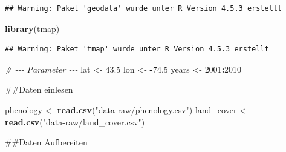 \documentclass[
]{article}
\newenvironment{Shaded}{\begin{snugshade}}{\end{snugshade}}
\newcommand{\CommentTok}[1]{\textcolor[rgb]{0.56,0.35,0.01}{\textit{#1}}}
\newcommand{\DecValTok}[1]{\textcolor[rgb]{0.00,0.00,0.81}{#1}}
\newcommand{\FloatTok}[1]{\textcolor[rgb]{0.00,0.00,0.81}{#1}}
\newcommand{\FunctionTok}[1]{\textcolor[rgb]{0.13,0.29,0.53}{\textbf{#1}}}
\newcommand{\NormalTok}[1]{#1}
\newcommand{\OtherTok}[1]{\textcolor[rgb]{0.56,0.35,0.01}{#1}}
\newcommand{\SpecialCharTok}[1]{\textcolor[rgb]{0.81,0.36,0.00}{\textbf{#1}}}
\newcommand{\StringTok}[1]{\textcolor[rgb]{0.31,0.60,0.02}{#1}}
\begin{document}
\begin{verbatim}
## Warning: Paket 'geodata' wurde unter R Version 4.5.3 erstellt
\end{verbatim}

\begin{Shaded}
\begin{Highlighting}[]
\FunctionTok{library}\NormalTok{(tmap)}
\end{Highlighting}
\end{Shaded}

\begin{verbatim}
## Warning: Paket 'tmap' wurde unter R Version 4.5.3 erstellt
\end{verbatim}

\begin{Shaded}
\begin{Highlighting}[]
\CommentTok{\# {-}{-}{-} Parameter {-}{-}{-}}
\NormalTok{lat }\OtherTok{\textless{}{-}} \FloatTok{43.5}
\NormalTok{lon }\OtherTok{\textless{}{-}} \SpecialCharTok{{-}}\FloatTok{74.5}
\NormalTok{years }\OtherTok{\textless{}{-}} \DecValTok{2001}\SpecialCharTok{:}\DecValTok{2010}
\end{Highlighting}
\end{Shaded}

\#\#Daten einlesen

\begin{Shaded}
\begin{Highlighting}[]
\NormalTok{phenology }\OtherTok{\textless{}{-}} \FunctionTok{read.csv}\NormalTok{(}\StringTok{"data{-}raw/phenology.csv"}\NormalTok{)}
\NormalTok{land\_cover }\OtherTok{\textless{}{-}} \FunctionTok{read.csv}\NormalTok{(}\StringTok{"data{-}raw/land\_cover.csv"}\NormalTok{)}
\end{Highlighting}
\end{Shaded}

\#\#Daten Aufbereiten
\end{document}
